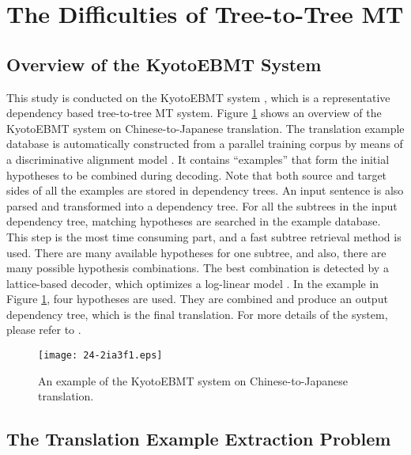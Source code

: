 \documentclass[english]{jnlp_1.4}
\begin{document}
\section{The Difficulties of Tree-to-Tree MT}

\subsection{Overview of the KyotoEBMT System}
\label{subsec:ebmt_overview}

This study is conducted on the KyotoEBMT system \cite{richardson-EtAl:2015:WAT}, 
which is a representative dependency based tree-to-tree MT system.
Figure \ref{fig:ebmt} shows an overview of the KyotoEBMT system on
Chinese-to-Japanese translation. The translation example database is
automatically constructed from a parallel training corpus by means of
a discriminative alignment model \cite{riesa-irvine-marcu:2011:EMNLP}. 
It contains ``examples'' that form the initial hypotheses to be combined 
during decoding. Note that both source and target sides
of all the examples are stored in dependency trees. An input
sentence is also parsed and transformed into a dependency tree. For
all the subtrees in the input dependency tree, matching hypotheses
are searched in the example database. This step is the most time
consuming part, and a fast subtree retrieval method 
\cite{cromieres-kurohashi:2011:EMNLP} is used. There are many available
hypotheses for one subtree, and also, there are many possible hypothesis
combinations. The best combination is detected by a lattice-based decoder,
which optimizes a log-linear model \cite{cromieres-kurohashi:2014:EMNLP2014}.
In the example in Figure \ref{fig:ebmt}, four hypotheses are used. They
are combined and produce an output dependency tree, which is the final translation. 
For more details of the system, please refer to \cite{richardson-EtAl:2015:WAT}.

\begin{figure}[t]
\begin{center}
\texttt{[image: 24-2ia3f1.eps]}
\end{center}
\caption{An example of the KyotoEBMT system on Chinese-to-Japanese translation.}
\label{fig:ebmt}
\end{figure}


\subsection{The Translation Example Extraction Problem}
\end{document}
